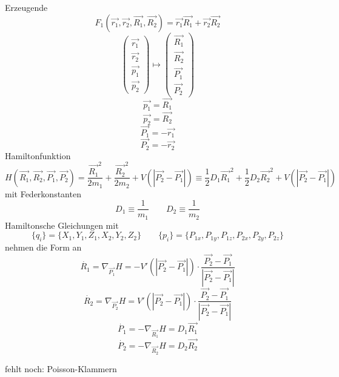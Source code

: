 \documentclass[11pt]{article} %
\begin{document}
Erzeugende \begin{equation} F_1(\vec{r_1}, \vec{r_2},\vec{R_1},\vec{R_2}) = \vec{r_1}\vec{R_1} + \vec{r_2}\vec{R_2} \end{equation}
\begin{equation}
\begin{pmatrix}
\vec{r_1} \\ \vec{r_2} \\ \vec{p_1} \\ \vec{p_2}
\end{pmatrix}
\mapsto
\begin{pmatrix}
\vec{R_1} \\ \vec{R_2} \\ \vec{P_1} \\ \vec{P_2}
\end{pmatrix}
\end{equation}
\begin{equation} \vec{p_1} = \vec{R_1} \end{equation}
\begin{equation} \vec{p_2} = \vec{R_2} \end{equation}
\begin{equation} \vec{P_1} = -\vec{r_1} \end{equation}
\begin{equation} \vec{P_2} = -\vec{r_2} \end{equation}
Hamiltonfunktion
\begin{equation}
H(\vec{R_1},\vec{R_2},\vec{P_1},\vec{P_2}) = 
\frac{\vec{R_1}^2}{2m_1} +  \frac{\vec{R_2}^2}{2m_2}
+ V(\left| \vec{P_2} - \vec{P_1} \right|) 
\equiv \frac{1}{2}D_1\vec{R_1}^2 + \frac{1}{2}D_2\vec{R_2}^2 + V(\left| \vec{P_2} - \vec{P_1} \right|)
\end{equation}
mit Federkonstanten
\begin{equation} D_1 \equiv \frac{1}{m_1} \quad \quad  D_2 \equiv \frac{1}{m_2} \end{equation}
Hamiltonsche Gleichungen
mit
\begin{equation} \{q_i\} = \{ X_1, Y_1, Z_1, X_2, Y_2, Z_2 \} \quad \quad \{p_i\} = \{ P_{1x}, P_{1y}, P_{1z}, P_{2x}, P_{2y}, P_{2z} \} \end{equation}
nehmen die Form an
\begin{equation} \dot{R_1} = \nabla_{\vec{P_1}} H = -V'( \left| \vec{P_2} - \vec{P_1} \right| ) \cdot \frac{ \vec{P_2} - \vec{P_1} }{\left| \vec{P_2} - \vec{P_1} \right|} \end{equation}
\begin{equation} \dot{R_2} = \nabla_{\vec{P_2}} H = V'( \left| \vec{P_2} - \vec{P_1} \right| ) \cdot \frac{ \vec{P_2} - \vec{P_1} }{\left| \vec{P_2} - \vec{P_1} \right|} \end{equation}
\begin{equation} \dot{P_1} = - \nabla_{\vec{R_1}} H = D_1 \vec{R_1} \end{equation}
\begin{equation} \dot{P_2} = - \nabla_{\vec{R_2}} H = D_2 \vec{R_2} \end{equation}

fehlt noch: Poisson-Klammern
\end{document}
